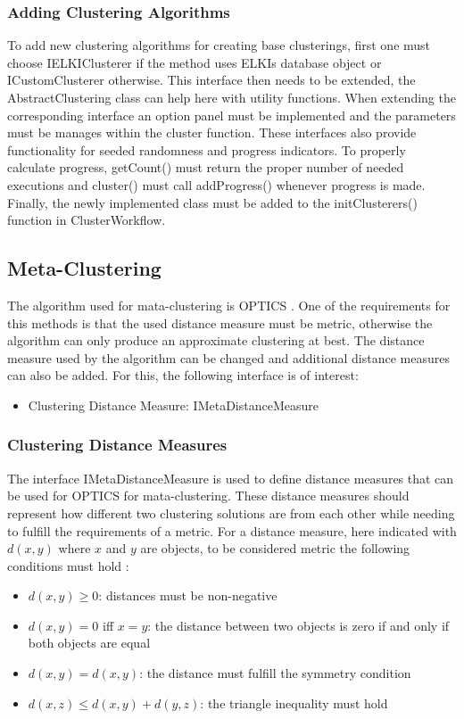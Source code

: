 \documentclass[
	a4paper,
	english,
	twoside,
	openright,               
	11pt                            
	]{report}
\begin{document}
\subsubsection*{Adding Clustering Algorithms}
To add new clustering algorithms for creating base clusterings, first one must choose IELKIClusterer if the method uses ELKIs database object or ICustomClusterer otherwise. This interface then needs to be extended, the AbstractClustering class can help here with utility functions. When extending the corresponding interface an option panel must be implemented and the parameters must be manages within the cluster function. These interfaces also provide functionality for seeded randomness and progress indicators. To properly calculate progress, getCount() must return the proper number of needed executions and cluster() must call addProgress() whenever progress is made. Finally, the newly implemented class must be added to the initClusterers() function in ClusterWorkflow.


\subsection{Meta-Clustering}
The algorithm used for mata-clustering is OPTICS \cite{10.1145/304181.304187}. One of the requirements for this methods is that the used distance measure must be metric, otherwise the algorithm can only produce an approximate clustering at best. The distance measure used by the algorithm can be changed and additional distance measures can also be added. For this, the following interface is of interest:

\begin{itemize}
  \item Clustering Distance Measure: IMetaDistanceMeasure
\end{itemize}
\subsubsection{Clustering Distance Measures}
The interface IMetaDistanceMeasure is used to define distance measures that can be used for OPTICS for mata-clustering. These distance measures should represent how different two clustering solutions are from each other while needing to fulfill the requirements of a metric. For a distance measure, here indicated with $d(x,y)$ where $x$ and $y$ are objects, to be considered metric the following conditions must hold \cite{10.5555/1756006.1953024}:
\begin{itemize}
  \item $d(x,y)\geq0$: distances must be non-negative
  \item $d(x,y)=0$ iff $x=y$: the distance between two objects is zero if and only if both objects are equal
  \item $d(x,y)=d(x,y)$: the distance must fulfill the symmetry condition
  \item $d(x,z)\leq d(x,y)+d(y,z)$: the triangle inequality must hold
\end{itemize}
\end{document}
